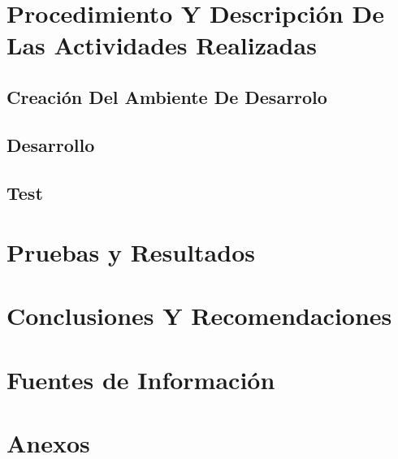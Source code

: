 \documentclass[a4paper,12pt]{report}
\begin{document}
		\chapter {Procedimiento Y Descripción De Las Actividades Realizadas}
			
			
			\section {Creación Del Ambiente De Desarrolo}
				
				
			\section {Desarrollo}
				
				
			\section {Test }
				
			
		
		\chapter {Pruebas y Resultados}
			
		
		\chapter {Conclusiones Y Recomendaciones}
		
		\chapter {Fuentes de Información}
			
			
		\chapter {Anexos}
\end{document}
